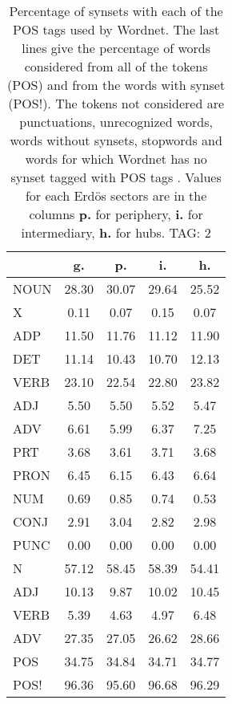 \begin{table}[h!]
\begin{center}
\begin{tabular}{| l || c | c | c | c |}\hline
 & {\bf g.} & {\bf p.} & {\bf i.} & {\bf h.} \\\hline\hline
NOUN & 28.30  & 30.07  & 29.64  & 25.52 \\
X & 0.11  & 0.07  & 0.15  & 0.07 \\\hline
ADP & 11.50  & 11.76  & 11.12  & 11.90 \\
DET & 11.14  & 10.43  & 10.70  & 12.13 \\\hline
VERB & 23.10  & 22.54  & 22.80  & 23.82 \\\hline
ADJ & 5.50  & 5.50  & 5.52  & 5.47 \\
ADV & 6.61  & 5.99  & 6.37  & 7.25 \\\hline
PRT & 3.68  & 3.61  & 3.71  & 3.68 \\
PRON & 6.45  & 6.15  & 6.43  & 6.64 \\
NUM & 0.69  & 0.85  & 0.74  & 0.53 \\
CONJ & 2.91  & 3.04  & 2.82  & 2.98 \\
PUNC & 0.00  & 0.00  & 0.00  & 0.00 \\\hline\hline\hline
N & 57.12  & 58.45  & 58.39  & 54.41 \\\hline
ADJ & 10.13  & 9.87  & 10.02  & 10.45 \\\hline
VERB & 5.39  & 4.63  & 4.97  & 6.48 \\\hline
ADV & 27.35  & 27.05  & 26.62  & 28.66 \\\hline\hline
POS & 34.75  & 34.84  & 34.71  & 34.77 \\\hline
POS! & 96.36  & 95.60  & 96.68  & 96.29 \\\hline
\end{tabular}
\caption{Percentage of synsets with each of the POS tags used by Wordnet. The last lines give the percentage of words considered from all of the tokens (POS) and from the words with synset (POS!). The tokens not considered are punctuations, unrecognized words, words without synsets, stopwords and words for which Wordnet has no synset  tagged with POS tags . Values for each Erd\"os sectors are in the columns {{\bf p.}} for periphery, {{\bf i.}} for intermediary, {{\bf h.}} for hubs. TAG: 2}
\end{center}
\end{table}